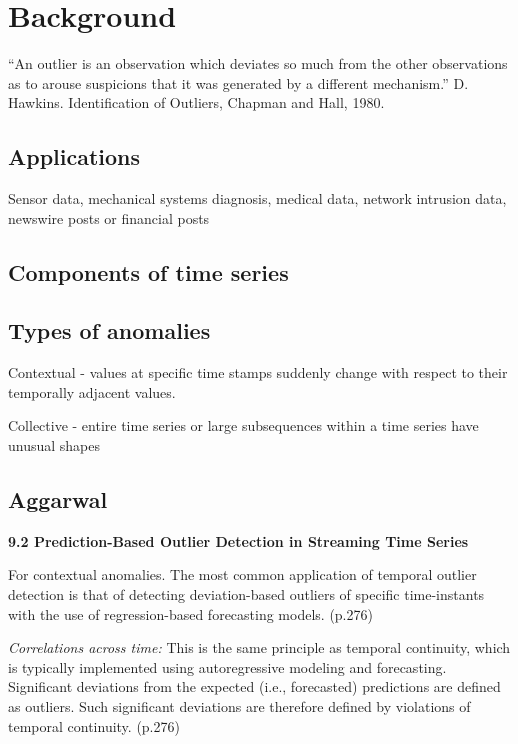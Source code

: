 \section{Background}

“An outlier is an observation which deviates so much from the other observations as to arouse suspicions that it was generated by a different mechanism.” D. Hawkins. Identification of Outliers, Chapman and Hall, 1980.

\subsection{Applications}
Sensor data, mechanical systems diagnosis, medical data, network intrusion data, newswire posts or financial posts

\subsection{Components of time series}

\subsection{Types of anomalies}

Contextual - values at specific time stamps suddenly change with respect to their temporally adjacent values. 

Collective - entire time series or large subsequences within a time series have unusual shapes \cite{Aggarwal2013a}

\subsection{Aggarwal}

\textbf{9.2 Prediction-Based Outlier Detection in Streaming Time Series}

For contextual anomalies. The most common application of temporal outlier detection is that of detecting deviation-based outliers of specific time-instants with the use of regression-based forecasting models.  (p.276)

\textit{Correlations across time:} This is the same principle as temporal continuity, which is typically implemented using autoregressive modeling and forecasting. Significant deviations from the expected (i.e., forecasted) predictions are defined as outliers. Such significant deviations are therefore defined by violations of temporal continuity. (p.276)

